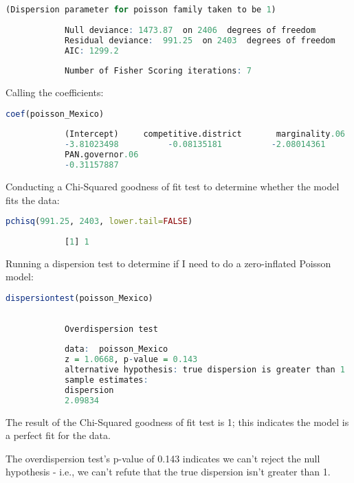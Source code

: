 \documentclass[12pt,letterpaper]{article}
\begin{document}
\begin{enumerate}
\begin{lstlisting}[language=R]
			(Dispersion parameter for poisson family taken to be 1)
			
			Null deviance: 1473.87  on 2406  degrees of freedom
			Residual deviance:  991.25  on 2403  degrees of freedom
			AIC: 1299.2
			
			Number of Fisher Scoring iterations: 7
		\end{lstlisting}
		
		\vspace{.35cm}	
		
		Calling the coefficients:
		\begin{lstlisting}[language=R]
			coef(poisson_Mexico)
			
			(Intercept) 	competitive.district       marginality.06       
			-3.81023498          -0.08135181          -2.08014361        
			PAN.governor.06
			-0.31157887
		\end{lstlisting}
		
		\vspace{.35cm}
		
		Conducting a Chi-Squared goodness of fit test to determine whether the model fits the data:
		\begin{lstlisting}[language=R]
			pchisq(991.25, 2403, lower.tail=FALSE)
			
			[1] 1
		\end{lstlisting}
		
		\vspace{.2cm}	
		
		Running a dispersion test to determine if I need to do a zero-inflated Poisson model:
		\begin{lstlisting}[language=R]
			dispersiontest(poisson_Mexico)
			
			
			Overdispersion test
			
			data:  poisson_Mexico
			z = 1.0668, p-value = 0.143
			alternative hypothesis: true dispersion is greater than 1
			sample estimates:
			dispersion 
			2.09834 
		\end{lstlisting}
		
		\vspace{.35cm}
		
		The result of the Chi-Squared goodness of fit test is 1; this indicates the model is a perfect fit for the data.
		
		\vspace{.2cm}
		
		The overdispersion test's p-value of 0.143 indicates we can't reject the null hypothesis - i.e., we can't refute that the true dispersion isn't greater than 1.
		

\end{enumerate}
\end{document}
